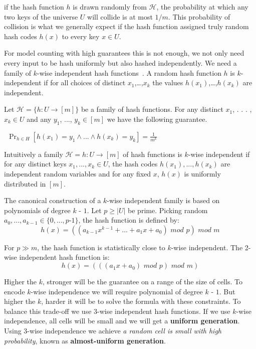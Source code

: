 \documentclass{svproc}
\newcommand{\hash}{$\mathcal{H}$}
\begin{document}
if the hash function $h$ is drawn randomly from \hash, the probability at which any two keys of the universe $U$ will collide is at most $1/m$.
%
This probability of collision is what we generally expect if the hash function assigned truly random hash codes $h(x)$ to every key $x \in U$.

For model counting with high guarantees this is not enough, we not only need every input to be hash uniformly but also hashed independently. We need a family of $k$-wise independent hash functions~\cite{DBLP:conf/focs/WegmanC79}.
%
A random hash function $h$ is $k$-independent if for all choices of distinct $x_1$,…,$x_k$ the values $h(x_1)$,…,$h(x_k)$ are independent.
\begin{definition}
	Let $\mathcal{H}=\{h: U \to [m]\}$ be a family of hash functions. For any distinct $x_1$, . . . , $x_k \in U$ and any $y_1$, ..., $y_k \in [m]$ we have the following guarantee.

	$~~\Pr_{h\in H}
	[h(x_1) = y_1 \land ... \land h(x_k) = y_k] = \frac {1}
	{m^
		k}$
\end{definition}

Intuitively a family $\mathcal{H} = {h : U \to [m]}$ of hash functions
is $k$-wise independent if for any distinct keys $x_1, ..., x_k \in U$, the hash codes $h(x_1), ..., h(x_k)$ are independent random variables and for any fixed $x$, $h(x)$ is uniformly distributed in $[m]$.

The canonical construction of a $k$-wise independent family is based on polynomials
of degree $k$ - $1$. Let $p \geq |U|$ be prime. Picking random $a_0,...,a_{k - 1} \in \{0, . . . , p$-$ 1\}$,
the hash function is defined by:
\[ h(x) = ( ( a_{k-1} x^ {k - 1} + ... + a_1 x + a_0) \,\, mod \,\, p) \,\, mod \,\,  m\]


For $p \gg	 m$, the hash function is statistically close to $k$-wise independent. The 2-wise independent hash function is:
\[ h(x) = (((a_1 x + a_0) \,\, mod \,\, p) \,\, mod \,\, m ) \]


Higher the $k$, stronger will be the guarantee on a range of the size of cells. 
%
To encode $k$-wise independence we will require polynomial of degree $k$ - $1$.
%
But higher the $k$, harder it will be to solve the formula with these constraints. 
%
To balance this trade-off we use 3-wise independent hash functions.
%
If we use $k$-wise independence, all cells will be small and we will get a \textbf{uniform generation}. 
%
Using $3$-wise independence we achieve \emph{a random cell is small with high probability}, known as \textbf{almost-uniform generation}.
\end{document}
